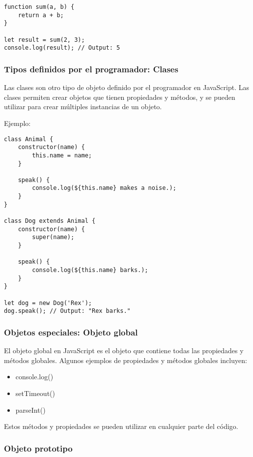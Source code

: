 \documentclass[executivepaper]{article}
\begin{document}
\begin{lstlisting}
function sum(a, b) {
    return a + b;
}

let result = sum(2, 3);
console.log(result); // Output: 5
\end{lstlisting}

\subsubsection*{Tipos definidos por el programador: Clases}

Las clases son otro tipo de objeto definido por el programador en JavaScript. Las clases permiten crear objetos que tienen propiedades y métodos, y se pueden utilizar para crear múltiples instancias de un objeto.

Ejemplo:

\begin{lstlisting}
class Animal {
    constructor(name) {
        this.name = name;
    }

    speak() {
        console.log(${this.name} makes a noise.);
    }
}

class Dog extends Animal {
    constructor(name) {
        super(name);
    }

    speak() {
        console.log(${this.name} barks.);
    }
}

let dog = new Dog('Rex');
dog.speak(); // Output: "Rex barks."
\end{lstlisting}

\subsubsection*{Objetos especiales: Objeto global}

El objeto global en JavaScript es el objeto que contiene todas las propiedades y métodos globales. Algunos ejemplos de propiedades y métodos globales incluyen:

\begin{itemize}
\item console.log()
\item setTimeout()
\item parseInt()
\end{itemize}

Estos métodos y propiedades se pueden utilizar en cualquier parte del código.

\subsubsection*{Objeto prototipo}
\end{document}
